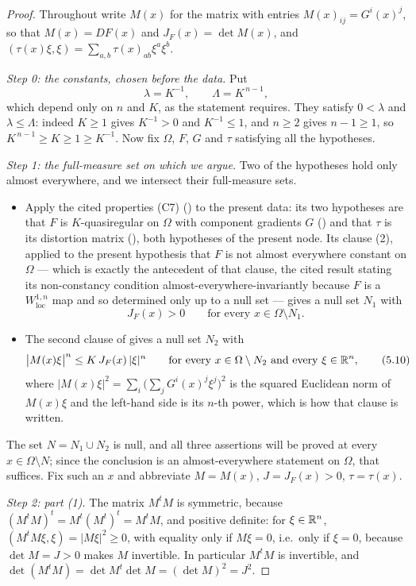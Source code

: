 \begin{proof}
Throughout write $M(x)$ for the matrix with entries $M(x)_{ij}=G^i(x)^j$, so
that $M(x)=DF(x)$ and $J_F(x)=\det M(x)$, and
$(\tau(x)\xi,\xi)=\sum_{a,b}\tau(x)_{ab}\xi^a\xi^b$.

\emph{Step 0: the constants, chosen before the data.}  Put
\[
\lambda=K^{-1},\qquad \Lambda=K^{\,n-1} ,
\]
which depend only on $n$ and $K$, as the statement requires.  They satisfy
$0<\lambda$ and $\lambda\le\Lambda$: indeed $K\ge1$ gives $K^{-1}>0$ and
$K^{-1}\le1$, and $n\ge2$ gives $n-1\ge1$, so $K^{\,n-1}\ge K\ge1\ge K^{-1}$.
Now fix $\Omega$, $F$, $G$ and $\tau$ satisfying all the hypotheses.

\emph{Step 1: the full-measure set on which we argue.}  Two of the hypotheses
hold only almost everywhere, and we intersect their full-measure sets.
\begin{itemize}
\item Apply the cited properties (C7) () to the
  present data: its two hypotheses are that $F$ is $K$-quasiregular on $\Omega$
  with component gradients $G$ () and that $\tau$ is
  its distortion matrix (), both hypotheses of the
  present node.  Its clause (2), applied to the present hypothesis that $F$ is
  not almost everywhere constant on $\Omega$ --- which is exactly the antecedent
  of that clause, the cited result stating its non-constancy condition
  almost-everywhere-invariantly because $F$ is a $W^{1,n}_{\mathrm{loc}}$ map and
  so determined only up to a null set --- gives a null set $N_1$ with
  \[
  J_F(x)>0\qquad\text{for every }x\in\Omega\setminus N_1 .
  \]
\item The second clause of  gives a null set $N_2$
  with
  \[
  \bigl|M(x)\xi\bigr|^{n}\le K\,J_F(x)\,|\xi|^{n}
  \qquad\text{for every }x\in\Omega\setminus N_2\text{ and every }\xi\in\mathbb{R}^n ,
  \tag{5.10}
  \]
  where $|M(x)\xi|^2=\sum_i\bigl(\sum_jG^i(x)^j\xi^j\bigr)^2$ is the squared
  Euclidean norm of $M(x)\xi$ and the left-hand side is its $n$-th power, which
  is how that clause is written.
\end{itemize}
The set $N=N_1\cup N_2$ is null, and all three assertions will be proved at
every $x\in\Omega\setminus N$; since the conclusion is an almost-everywhere
statement on $\Omega$, that suffices.  Fix such an $x$ and abbreviate
$M=M(x)$, $J=J_F(x)>0$, $\tau=\tau(x)$.

\emph{Step 2: part (1).}  The matrix $M^tM$ is symmetric, because
$(M^tM)^t=M^t(M^t)^t=M^tM$, and positive definite: for $\xi\in\mathbb{R}^n$,
$(M^tM\xi,\xi)=|M\xi|^2\ge0$, with equality only if $M\xi=0$, i.e.\ only if
$\xi=0$, because $\det M=J>0$ makes $M$ invertible.  In particular $M^tM$ is
invertible, and $\det(M^tM)=\det M^t\det M=(\det M)^2=J^2$.


\end{proof}
